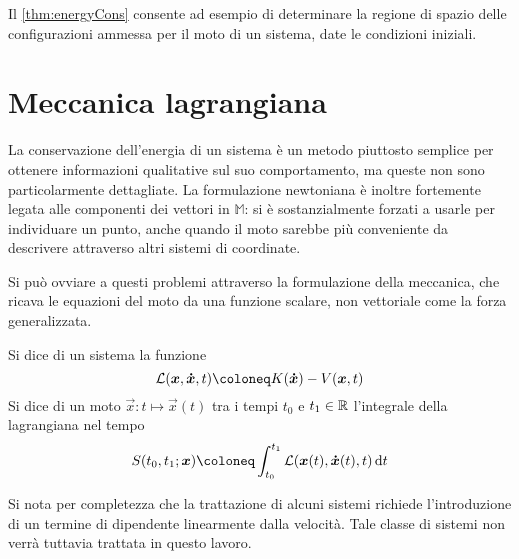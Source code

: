 Il \autoref{thm:energyCons} consente ad esempio di determinare la regione di spazio delle configurazioni ammessa per il moto di un sistema, date le condizioni iniziali.

\section{Meccanica lagrangiana}
La conservazione dell'energia di un sistema è un metodo piuttosto semplice per ottenere informazioni qualitative sul suo comportamento, ma queste non sono particolarmente dettagliate. La formulazione newtoniana è inoltre fortemente legata alle componenti dei vettori in $\mathbb{M}$: si è sostanzialmente forzati a usarle per individuare un punto, anche quando il moto sarebbe più conveniente da descrivere attraverso altri sistemi di coordinate.

Si può ovviare a questi problemi attraverso la formulazione  della meccanica, che ricava le equazioni del moto da una funzione scalare, non vettoriale come la forza generalizzata.

\begin{definition}
  Si dice  di un sistema la funzione \begin{equation}
  \mathcal{L}(\vec{x},\vec{\dot{x}},t) \defeq K(\vec{\dot{x}}) - V(\vec{x},t)
  \end{equation} 
  Si dice  di un moto $\vec{x}:t\mapsto \vec{x}(t)$ tra i tempi $t_0$ e $t_1 \in \mathbb{R}$ l'integrale della lagrangiana nel tempo \begin{equation} \label{eq:action}
  S(t_0,t_1; \vec{x}) \defeq \int_{t_0}^{t_1} \mathcal{L}(\vec{x}(t),\vec{\dot{x}}(t),t) \dd{t}
  \end{equation}
\end{definition}

\begin{remark}
  Si nota per completezza che la trattazione di alcuni sistemi richiede l'introduzione di un termine di  dipendente linearmente dalla velocità. Tale classe di sistemi non verrà tuttavia trattata in questo lavoro.
\end{remark}

